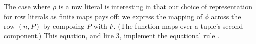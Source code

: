 \documentclass[sigplan,screen]{acmart}
\begin{document}
\begin{AgdaAlign}
\begin{code}[hide]
\AgdaOperator{\AgdaInductiveConstructor{\$}}\AgdaSpace{}%
\AgdaSymbol{\}}\AgdaSpace{}%
\AgdaSymbol{\{}\AgdaSymbol{\}}\AgdaSpace{}%
\AgdaSymbol{(}\AgdaSpace{}%
\AgdaSymbol{)}\AgdaSpace{}%
\AgdaSymbol{=}\AgdaSpace{}%
\AgdaSpace{}%
\<%
\\
\>[0]\<%
\\
%
\>[2]\AgdaSpace{}%
\AgdaSymbol{\{}\AgdaSpace{}%
\AgdaSymbol{=}\AgdaSpace{}%
\AgdaSymbol{\}}\AgdaSpace{}%
\AgdaSymbol{\{}\AgdaSymbol{\}}\AgdaSpace{}%
\AgdaSymbol{\{}\AgdaSpace{}%
\AgdaSpace{}%
\AgdaSymbol{\}}\AgdaSpace{}%
\AgdaSymbol{(}\AgdaSpace{}%
\AgdaSymbol{)}\AgdaSpace{}%
\AgdaSymbol{=}\AgdaSpace{}%
\AgdaSpace{}%
\<%
\\
%
\>[2]\AgdaSpace{}%
\AgdaSymbol{\{}\AgdaSpace{}%
\AgdaSymbol{=}\AgdaSpace{}%
\AgdaSymbol{\}}\AgdaSpace{}%
\AgdaSymbol{\{}\AgdaSymbol{\}}\AgdaSpace{}%
\AgdaSymbol{\{}\AgdaSpace{}%
\AgdaSpace{}%
\AgdaSymbol{\}}\AgdaSpace{}%
\AgdaSymbol{(}\AgdaSpace{}%
\AgdaSymbol{)}\AgdaSpace{}%
\AgdaSymbol{=}\AgdaSpace{}%
\AgdaSpace{}%
\<%
\\
%
\>[2]\AgdaSpace{}%
\AgdaSymbol{\{}\AgdaSpace{}%
\AgdaSymbol{=}\AgdaSpace{}%
\AgdaSymbol{\}}\AgdaSpace{}%
\AgdaSymbol{\{}\AgdaSymbol{\}}\AgdaSpace{}%
\AgdaSymbol{\{}\AgdaSpace{}%
\AgdaOperator{\AgdaInductiveConstructor{\$}}\AgdaSpace{}%
\AgdaSymbol{\}}\AgdaSpace{}%
\AgdaSymbol{(}\AgdaSpace{}%
\AgdaSymbol{)}\AgdaSpace{}%
\AgdaSymbol{=}\AgdaSpace{}%
\AgdaSpace{}%
\<%
\end{code}
\end{AgdaAlign}

\Ni The case where $\rho$ is a row literal is interesting in that our choice of representation for row literals as finite maps pays off: we express the mapping of $\phi$ across the row $(n , P)$ by composing $P$ with $F$. (The function  maps over a tuple's second component.) This equation, and line 3, implement the equational rule . 
\end{document}
